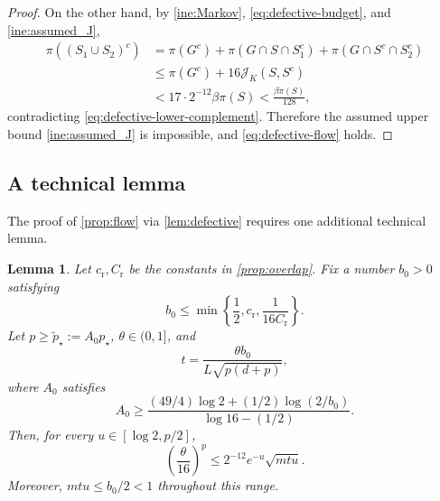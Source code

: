 \documentclass[11pt]{article}
\newtheorem{lemma}[lemma]{Lemma}
\newcommand{\1}{\mathbf 1}
\begin{document}
\begin{proof}
		On the other hand, by \eqref{ine:Markov}, \eqref{eq:defective-budget}, and \eqref{ine:assumed_J},
		\[
		\begin{aligned}
			\pi((S_1\cup S_2)^c) &= \pi(G^c) + \pi(G \cap S \cap S_1^c) + \pi(G \cap S^c \cap S_2^c) \\
			&\leq
			\pi(G^c)+ 16 \mathcal{J}_K(S,S^c)\\
			&< 17\cdot2^{-12}  \beta \pi(S)
			<\frac{\beta \pi(S)}{128},
		\end{aligned}
		\]
		contradicting \eqref{eq:defective-lower-complement}.  Therefore the assumed
		upper bound \eqref{ine:assumed_J} is impossible, and \eqref{eq:defective-flow}
		holds.
	\end{proof}
	
	
	\subsection{A technical lemma}
	
	The proof of \cref{prop:flow} via \cref{lem:defective} requires one additional
	technical lemma.
	
	\begin{lemma} \label{lem:exceptional-budget}
		Let \(c_{\mathrm r},C_{\mathrm r}\) be the constants in
		\cref{prop:overlap}.  Fix a number \(b_0>0\) satisfying
		\begin{equation} \label{eq:b0-choice}
			b_0\leq
			\min\left\{
			\frac12,
			c_{\mathrm r},
			\frac{1}{16C_{\mathrm r}}
			\right\}.
		\end{equation}
		Let \(p\geq  \widetilde p_\star:=A_0p_\star \),
		\(\theta\in(0,1]\), and
		\[
		t=\frac{\theta b_0}{L\sqrt{p(d+p)}},
		\]
		where $A_0$ satisfies
		\begin{equation}\label{eq:explicit-A0-choice}
			A_0\geq
			\frac{ (49/4) \log 2+(1/2)\log(2/b_0)}
			{\log 16-(1/2)}.
		\end{equation}
		Then, for every \(u\in[\log 2,p/2]\),
		\begin{equation}\label{eq:exceptional-budget-appendix}
			\left(\frac{\theta}{16}\right)^p
			\leq
			 2^{-12} e^{-u}\sqrt{m t u}.
		\end{equation}
		Moreover, \(mtu\leq b_0/2<1\) throughout this range.
	\end{lemma}
	
\end{document}
